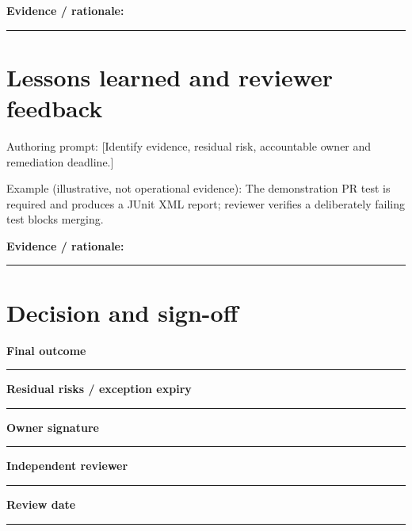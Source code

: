 \documentclass[11pt,letterpaper]{article}
\begin{document}
\noindent\textbf{Evidence / rationale:}\par\nobreak\vspace{8pt}\noindent\rule{0.93\linewidth}{0.4pt}\par\vspace{14pt}
\section{Lessons learned and reviewer feedback}
Authoring prompt: [Identify evidence, residual risk, accountable owner and remediation deadline.]

Example (illustrative, not operational evidence): The demonstration PR test is required and produces a JUnit XML report; reviewer verifies a deliberately failing test blocks merging.

\noindent\textbf{Evidence / rationale:}\par\nobreak\vspace{8pt}\noindent\rule{0.93\linewidth}{0.4pt}\par\vspace{14pt}
\section{Decision and sign-off}
\noindent\textbf{Final outcome}\par\nobreak\vspace{6pt}\noindent\rule{0.93\linewidth}{0.4pt}\par\vspace{14pt}
\noindent\textbf{Residual risks / exception expiry}\par\nobreak\vspace{6pt}\noindent\rule{0.93\linewidth}{0.4pt}\par\vspace{14pt}
\noindent\textbf{Owner signature}\par\nobreak\vspace{6pt}\noindent\rule{0.93\linewidth}{0.4pt}\par\vspace{14pt}
\noindent\textbf{Independent reviewer}\par\nobreak\vspace{6pt}\noindent\rule{0.93\linewidth}{0.4pt}\par\vspace{14pt}
\noindent\textbf{Review date}\par\nobreak\vspace{6pt}\noindent\rule{0.93\linewidth}{0.4pt}\par\vspace{14pt}
\end{document}
